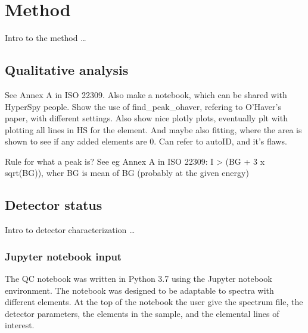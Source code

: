 \chapter{Method}
\label{ch:method}

Intro to the method \dots



\section{Qualitative analysis}
\label{method:qualitative_analysis}

See Annex A in ISO 22309. Also make a notebook, which can be shared with HyperSpy people.
Show the use of find_peak_ohaver, refering to O'Haver's paper, with different settings.
Also show nice plotly plots, eventually plt with plotting all lines in HS for the element.
And maybe also fitting, where the area is shown to see if any added elements are 0.
Can refer to autoID, and it's flaws.

Rule for what a peak is? See eg Annex A in ISO 22309: I > (BG + 3 x sqrt(BG)), wher BG is mean of BG (probably at the given energy)


\section{Detector status}
\label{method:eds_performance}

Intro to detector characterization \dots

\subsection{Jupyter notebook input}
\label{method:eds_performance:input}

The QC notebook was written in Python 3.7 using the Jupyter notebook environment.
The notebook was designed to be adaptable to spectra with different elements.
At the top of the notebook the user give the spectrum file, the detector parameters, the elements in the sample, and the elemental lines of interest.

